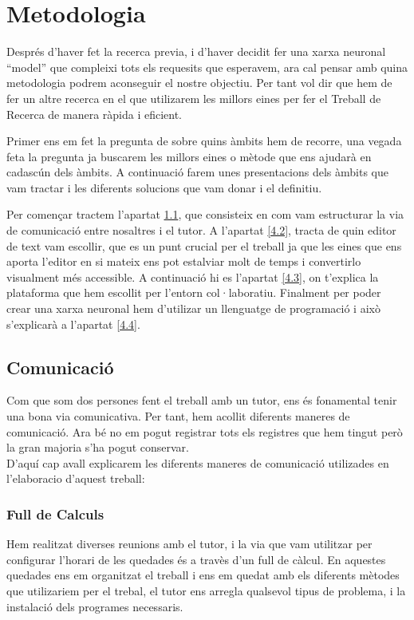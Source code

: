 \chapter{Metodologia}
Després d'haver fet la recerca previa, i d'haver decidit fer una xarxa neuronal ``model'' que compleixi tots els requesits que esperavem, ara cal pensar amb quina metodologia podrem aconseguir el nostre objectiu. Per tant vol dir que hem de fer un altre recerca en el que utilizarem les millors eines per fer el Treball de Recerca de manera ràpida i eficient.


Primer ens em fet la pregunta de  sobre quins àmbits hem de recorre, una vegada feta la pregunta ja buscarem les millors eines o mètode que ens ajudarà en cadascún dels àmbits. A continuació farem unes presentacions dels àmbits que vam tractar i les diferents solucions que vam donar i el definitiu.

Per començar tractem  l'apartat \ref{4.1}, que consisteix en com vam estructurar la via de comunicació entre nosaltres i el tutor. A l'apartat \ref{4.2}, tracta de quin editor de text vam escollir, que es un punt crucial per el treball ja que les eines que ens aporta l'editor en si mateix ens pot estalviar molt de temps i convertirlo visualment més accessible. A continuació hi es l'apartat \ref{4.3}, on t'explica la plataforma que hem escollit per l'entorn col·laboratiu. Finalment per poder crear una xarxa neuronal hem d'utilizar un llenguatge de programació i això s'explicarà a l'apartat \ref{4.4}.



\section{Comunicació}\label{4.1}
Com que som dos persones fent el treball amb un tutor, ens és fonamental tenir una bona via comunicativa. Per tant, hem acollit diferents maneres de comunicació. Ara bé no em pogut registrar tots els registres que hem tingut però la gran majoria s'ha pogut conservar.\\
D'aquí cap avall explicarem les diferents maneres de comunicació utilizades en l'elaboracio d'aquest treball:\\
\subsection{Full de Calculs}
Hem realitzat diverses reunions amb el tutor, i la via que vam utilitzar per configurar l'horari de les quedades és a travès d'un full de càlcul. En aquestes quedades ens em organitzat el treball i ens em quedat amb els diferents mètodes que utilizariem per el trebal, el tutor ens arregla qualsevol tipus de problema, i la instalació dels programes necessaris.
